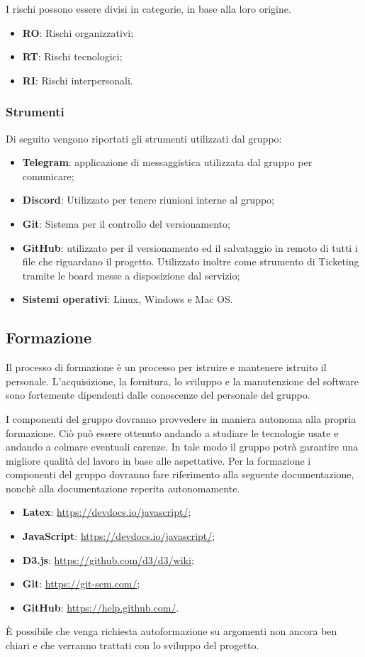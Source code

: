 				I rischi possono essere divisi in categorie, in base alla loro origine.
				\begin{itemize}
					\item \textbf{RO}: Rischi organizzativi;
					\item \textbf{RT}: Rischi tecnologici;
					\item \textbf{RI}: Rischi interpersonali.	
				\end{itemize}
			
		\subsubsection{Strumenti}
		Di seguito vengono riportati gli strumenti utilizzati dal gruppo:
		\begin{itemize}
			\item \textbf{Telegram}: applicazione di messaggistica utilizzata dal gruppo per comunicare;
			\item \textbf{Discord}: Utilizzato per tenere riunioni interne al gruppo;
			\item \textbf{Git}: Sistema per il controllo del versionamento;
			\item \textbf{GitHub}: utilizzato per il versionamento ed il salvataggio in remoto di tutti i file che riguardano il progetto. Utilizzato inoltre come strumento di Ticketing tramite le board messe a disposizione dal servizio;
			\item \textbf{Sistemi operativi}: Linux, Windows e Mac OS.
		\end{itemize}
		
		
		\subsection{Formazione}
		Il processo di formazione è un processo per istruire e mantenere istruito il personale. L'acquisizione, la fornitura, lo sviluppo e la manutenzione del software sono fortemente dipendenti dalle conoscenze del personale del gruppo.
		
		
		I componenti del gruppo dovranno provvedere in maniera autonoma alla propria formazione. Ciò può essere ottenuto andando a studiare le tecnologie usate e andando a colmare eventuali carenze. In tale modo il gruppo potrà garantire una migliore qualità del lavoro in base alle aspettative. Per la formazione i componenti del gruppo dovranno fare riferimento alla seguente documentazione, nonchè alla documentazione reperita autonomamente.
		\begin{itemize}
			\item \textbf{Latex}: \url{https://devdocs.io/javascript/};
			\item \textbf{JavaScript}: \url{https://devdocs.io/javascript/};
			\item \textbf{D3.js}: \url{https://github.com/d3/d3/wiki};
			\item \textbf{Git}: \url{https://git-scm.com/};
			\item \textbf{GitHub}: \url{https://help.github.com/}.
		\end{itemize}
		È possibile che venga richiesta autoformazione su argomenti non ancora ben chiari e che verranno trattati con lo sviluppo del progetto.	
		
